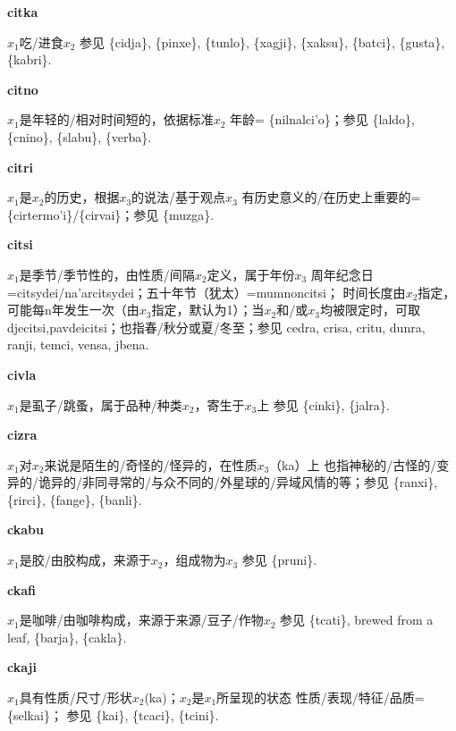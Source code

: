 \documentclass[notitlepage,twocolumn,a4paper,10pt]{book}
\begin{document}
{\sffamily\bfseries citka}\enspace {\ttfamily\bfseries[    cti]}  $x_1$吃\slash{}进食$x_2$ \textemdash{} 参见 \{cidja\}, \{pinxe\}, \{tunlo\}, \{xagji\}, \{xaksu\}, \{batci\}, \{gusta\}, \{kabri\}.

{\sffamily\bfseries citno}\enspace {\ttfamily\bfseries[cit     ci'o]}  $x_1$是年轻的\slash{}相对时间短的，依据标准$x_2$ \textemdash{} 年龄= \{nilnalci'o\}；参见 \{laldo\}, \{cnino\}, \{slabu\}, \{verba\}.

{\sffamily\bfseries citri}\enspace {\ttfamily\bfseries[cir]}  $x_1$是$x_2$的历史，根据$x_3$的说法\slash{}基于观点$x_3$ \textemdash{} 有历史意义的\slash{}在历史上重要的= \{cirtermo'i\}\slash{}\{cirvai\}；参见 \{muzga\}.

{\sffamily\bfseries citsi} $x_1$是季节\slash{}季节性的，由性质\slash{}间隔$x_2$定义，属于年份$x_3$ \textemdash{} 周年纪念日={citsydei}\slash{}{na'arcitsydei}；五十年节（犹太）={mumnoncitsi}； 时间长度由$x_2$指定，可能每n年发生一次（由$x_3$指定，默认为1）；当$x_2$和\slash{}或$x_3$均被限定时，可取{djecitsi},{pavdeicitsi}；也指春\slash{}秋分或夏\slash{}冬至；参见 {cedra}, {crisa}, {critu}, {dunra}, {ranji}, {temci}, {vensa}, {jbena}.

{\sffamily\bfseries civla}\enspace {\ttfamily\bfseries[civ]}  $x_1$是虱子\slash{}跳蚤，属于品种\slash{}种类$x_2$，寄生于$x_3$上 \textemdash{} 参见 \{cinki\}, \{jalra\}.

{\sffamily\bfseries cizra}\enspace {\ttfamily\bfseries[ciz]}  $x_1$对$x_2$来说是陌生的\slash{}奇怪的\slash{}怪异的，在性质$x_3$（ka）上 \textemdash{} 也指神秘的\slash{}古怪的\slash{}变异的\slash{}诡异的\slash{}非同寻常的\slash{}与众不同的\slash{}外星球的\slash{}异域风情的等；参见 \{ranxi\}, \{rirci\}, \{fange\}, \{banli\}.

{\sffamily\bfseries ckabu} $x_1$是胶\slash{}由胶构成，来源于$x_2$，组成物为$x_3$ \textemdash{} 参见 \{pruni\}.

{\sffamily\bfseries ckafi}\enspace {\ttfamily\bfseries[kaf]}  $x_1$是咖啡\slash{}由咖啡构成，来源于来源\slash{}豆子\slash{}作物$x_2$ \textemdash{} 参见 \{tcati\}, brewed from a leaf, \{barja\}, \{cakla\}.

{\sffamily\bfseries ckaji}\enspace {\ttfamily\bfseries[        kai]}  $x_1$具有性质\slash{}尺寸\slash{}形状$x_2$(ka)；$x_2$是$x_1$所呈现的状态 \textemdash{} 性质\slash{}表现\slash{}特征\slash{}品质= \{selkai\}； 参见 \{kai\}, \{tcaci\}, \{tcini\}.
\end{document}
